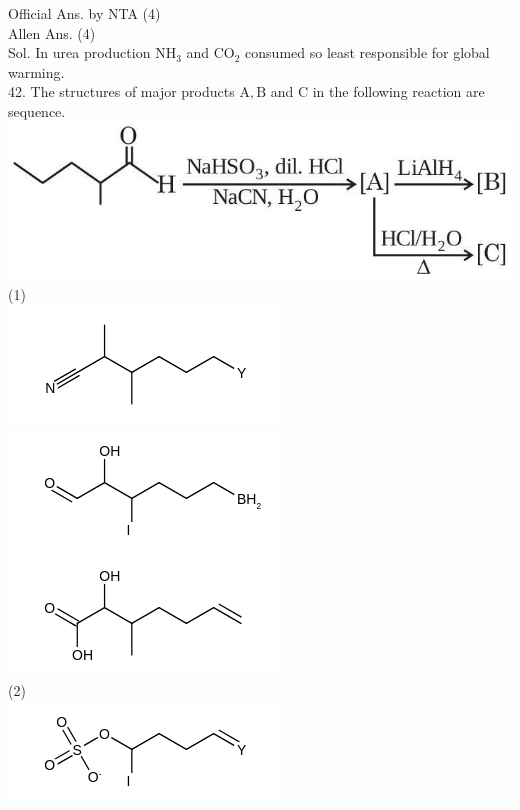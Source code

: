 \documentclass[10pt]{article}
\begin{document}
Official Ans. by NTA (4)\\
Allen Ans. (4)\\
Sol. In urea production \(\mathrm{NH}_{3}\) and \(\mathrm{CO}_{2}\) consumed so least responsible for global warming.\\
42. The structures of major products \(\mathrm{A}, \mathrm{B}\) and C in the following reaction are sequence.\\
\includegraphics[max width=\textwidth, center]{2025_10_02_a54bf82dc4585184bb5fg-3}\\
(1)\\
\includegraphics{smile-13ecc4c125ab70bb1de64b181b53e74c42b0cb0d}\\
\includegraphics{smile-86e94a9e6e34c2b215e0c4a3d149670b217daf17}\\
\includegraphics{smile-9e275ed13d42e2644c944580ae7a3d41c3cee138}\\
(2)\\
\includegraphics{smile-9291fbaeefa766594e122d44fef8ef70ced0d8cc}\\
\end{document}

